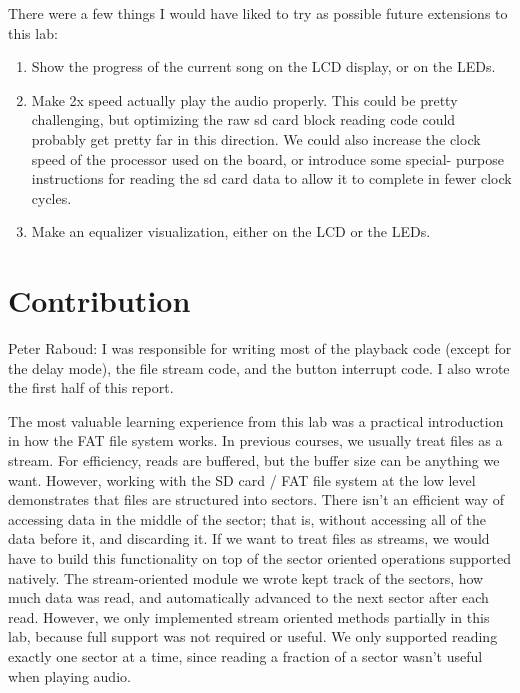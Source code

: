 \documentclass[12pt]{article}
\begin{document}
There were a few things I would have liked to try as possible future extensions
to this lab:
\begin{enumerate}
\item Show the progress of the current song on the LCD display, or on the LEDs.
\item Make 2x speed actually play the audio properly. This could be pretty
	challenging, but optimizing the raw sd card block reading code could
	probably get pretty far in this direction. We could also increase the
	clock speed of the processor used on the board, or introduce some special-
	purpose instructions for reading the sd card data to allow it to complete
	in fewer clock cycles.
\item Make an equalizer visualization, either on the LCD or the LEDs.
\end{enumerate}

\section{Contribution}
Peter Raboud:
I was responsible for writing most of the playback code (except for the delay mode),
the file stream code, and the button interrupt code.
I also wrote the first half of this report.

The most valuable learning experience from this lab was a practical introduction
in how the FAT file system works.
In previous courses, we usually treat files as a stream.
For efficiency, reads are buffered, but the buffer size can be anything we want.
However, working with the SD card / FAT file system at the low level demonstrates
that files are structured into sectors.
There isn't an efficient way of accessing data in the middle of the sector; that
is, without accessing all of the data before it, and discarding it.
If we want to treat files as streams, we would have to build this functionality
on top of the sector oriented operations supported natively.
The stream-oriented module we wrote kept track of the sectors, how much data was
read, and automatically advanced to the next sector after each read.
However, we only implemented stream oriented methods partially in this lab,
because full support was not required or useful.
We only supported reading exactly one sector at a time, since reading a fraction
of a sector wasn't useful when playing audio.
\end{document}
